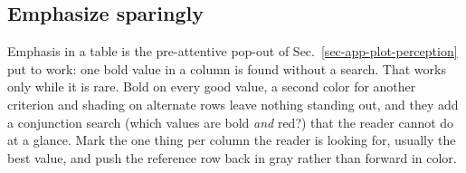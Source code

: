 \FloatBarrier
\subsection{Emphasize sparingly}\label{sec-app-table-emphasis}

Emphasis in a table is the pre-attentive pop-out of Sec.~\ref{sec-app-plot-perception} put to work: one bold value in a column is found without a search. That works only while it is rare. Bold on every good value, a second color for another criterion and shading on alternate rows leave nothing standing out, and they add a conjunction search (which values are bold \emph{and} red?) that the reader cannot do at a glance. Mark the one thing per column the reader is looking for, usually the best value, and push the reference row back in gray rather than forward in color.

